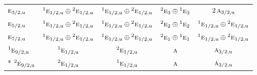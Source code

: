 \documentclass[10pt,a4paper]{article}
\numberwithin{equation}{section}
\newcommand{\irr}[1]{\text{\normalfont\scshape #1}}
\newcommand{\conjpair}[1]{{}^{#1}}
\newcommand{\ptag}[1]{\mathrm{#1}}
\begin{document}
{\begin{longtable}{@{}lcccc@{}}
$\irr{e}_{3/2,\ptag{u}}$ & $\conjpair{1}\irr{e}_{1/2,\ptag{u}}\oplus \conjpair{2}\irr{e}_{1/2,\ptag{u}}$ & $\conjpair{1}\irr{e}_{1/2,\ptag{u}}\oplus \conjpair{2}\irr{e}_{1/2,\ptag{u}}$ & $\conjpair{2}\irr{e}_{3}\oplus \conjpair{1}\irr{e}_{3}$ & $2\,\irr{a}_{3/2,\ptag{u}}$\\
$\irr{e}_{5/2,\ptag{u}}$ & $\conjpair{1}\irr{e}_{1/2,\ptag{u}}\oplus \conjpair{2}\irr{e}_{1/2,\ptag{u}}$ & $\conjpair{1}\irr{e}_{1/2,\ptag{u}}\oplus \conjpair{2}\irr{e}_{1/2,\ptag{u}}$ & $\conjpair{2}\irr{e}_{2}\oplus \conjpair{1}\irr{e}_{2}$ & $\conjpair{1}\irr{e}_{1/2,\ptag{u}}\oplus \conjpair{2}\irr{e}_{1/2,\ptag{u}}$\\
$\irr{e}_{7/2,\ptag{u}}$ & $\conjpair{1}\irr{e}_{1/2,\ptag{u}}\oplus \conjpair{2}\irr{e}_{1/2,\ptag{u}}$ & $\conjpair{1}\irr{e}_{1/2,\ptag{u}}\oplus \conjpair{2}\irr{e}_{1/2,\ptag{u}}$ & $\conjpair{2}\irr{e}_{1}\oplus \conjpair{1}\irr{e}_{1}$ & $\conjpair{1}\irr{e}_{1/2,\ptag{u}}\oplus \conjpair{2}\irr{e}_{1/2,\ptag{u}}$\\
$\conjpair{1}\irr{e}_{9/2,\ptag{u}}$ & $\conjpair{1}\irr{e}_{1/2,\ptag{u}}$ & $\conjpair{2}\irr{e}_{1/2,\ptag{u}}$ & $\irr{a}$ & $\irr{a}_{3/2,\ptag{u}}$\\*
$\conjpair{2}\irr{e}_{9/2,\ptag{u}}$ & $\conjpair{2}\irr{e}_{1/2,\ptag{u}}$ & $\conjpair{1}\irr{e}_{1/2,\ptag{u}}$ & $\irr{a}$ & $\irr{a}_{3/2,\ptag{u}}$\\
\bottomrule\end{longtable}}
\end{document}
